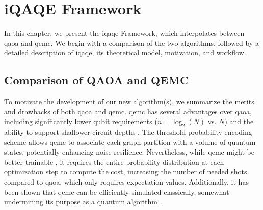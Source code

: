 
\chapter{iQAQE Framework}
\label{chapter:Base Algorithm}



In this chapter, we present the \acrshort{iqaqe} Framework, which interpolates between \acrshort{qaoa} and \acrshort{qemc}. We begin with a comparison of the two algorithms, followed by a detailed description of \acrshort{iqaqe}, its theoretical model, motivation, and workflow.


\section{Comparison of QAOA and QEMC}
To motivate the development of our new algorithm(s), we summarize the merits and drawbacks of both \acrshort{qaoa} and \acrshort{qemc}. \acrshort{qemc} has several advantages over \acrshort{qaoa}, including significantly lower qubit requirements ($n = \log_2(N)$ vs. $N$) and the ability to support shallower circuit depths \cite{tenecohen2023variational}. The threshold probability encoding scheme allows \acrshort{qemc} to associate each graph partition with a volume of quantum states, potentially enhancing noise resilience. Nevertheless, while \acrshort{qemc} might be better trainable \cite{tenecohen2023variational}, it requires the entire probability distribution at each optimization step to compute the cost, increasing the number of needed shots compared to \acrshort{qaoa}, which only requires expectation values. Additionally, it has been shown that \acrshort{qemc} can be efficiently simulated classically, somewhat undermining its purpose as a quantum algorithm \cite{tenecohen2023variational}.

